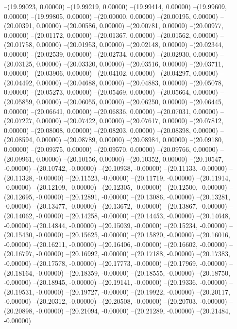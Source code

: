 --(19.99023, 0.00000)
--(19.99219, 0.00000)
--(19.99414, 0.00000)
--(19.99609, 0.00000)
--(19.99805, 0.00000)
--(20.00000, 0.00000)
--(20.00195, 0.00000)
--(20.00391, 0.00000)
--(20.00586, 0.00000)
--(20.00781, 0.00000)
--(20.00977, 0.00000)
--(20.01172, 0.00000)
--(20.01367, 0.00000)
--(20.01562, 0.00000)
--(20.01758, 0.00000)
--(20.01953, 0.00000)
--(20.02148, 0.00000)
--(20.02344, 0.00000)
--(20.02539, 0.00000)
--(20.02734, 0.00000)
--(20.02930, 0.00000)
--(20.03125, 0.00000)
--(20.03320, 0.00000)
--(20.03516, 0.00000)
--(20.03711, 0.00000)
--(20.03906, 0.00000)
--(20.04102, 0.00000)
--(20.04297, 0.00000)
--(20.04492, 0.00000)
--(20.04688, 0.00000)
--(20.04883, 0.00000)
--(20.05078, 0.00000)
--(20.05273, 0.00000)
--(20.05469, 0.00000)
--(20.05664, 0.00000)
--(20.05859, 0.00000)
--(20.06055, 0.00000)
--(20.06250, 0.00000)
--(20.06445, 0.00000)
--(20.06641, 0.00000)
--(20.06836, 0.00000)
--(20.07031, 0.00000)
--(20.07227, 0.00000)
--(20.07422, 0.00000)
--(20.07617, 0.00000)
--(20.07812, 0.00000)
--(20.08008, 0.00000)
--(20.08203, 0.00000)
--(20.08398, 0.00000)
--(20.08594, 0.00000)
--(20.08789, 0.00000)
--(20.08984, 0.00000)
--(20.09180, 0.00000)
--(20.09375, 0.00000)
--(20.09570, 0.00000)
--(20.09766, 0.00000)
--(20.09961, 0.00000)
--(20.10156, 0.00000)
--(20.10352, 0.00000)
--(20.10547, -0.00000)
--(20.10742, -0.00000)
--(20.10938, -0.00000)
--(20.11133, -0.00000)
--(20.11328, -0.00000)
--(20.11523, -0.00000)
--(20.11719, -0.00000)
--(20.11914, -0.00000)
--(20.12109, -0.00000)
--(20.12305, -0.00000)
--(20.12500, -0.00000)
--(20.12695, -0.00000)
--(20.12891, -0.00000)
--(20.13086, -0.00000)
--(20.13281, -0.00000)
--(20.13477, -0.00000)
--(20.13672, -0.00000)
--(20.13867, -0.00000)
--(20.14062, -0.00000)
--(20.14258, -0.00000)
--(20.14453, -0.00000)
--(20.14648, -0.00000)
--(20.14844, -0.00000)
--(20.15039, -0.00000)
--(20.15234, -0.00000)
--(20.15430, -0.00000)
--(20.15625, -0.00000)
--(20.15820, -0.00000)
--(20.16016, -0.00000)
--(20.16211, -0.00000)
--(20.16406, -0.00000)
--(20.16602, -0.00000)
--(20.16797, -0.00000)
--(20.16992, -0.00000)
--(20.17188, -0.00000)
--(20.17383, -0.00000)
--(20.17578, -0.00000)
--(20.17773, -0.00000)
--(20.17969, -0.00000)
--(20.18164, -0.00000)
--(20.18359, -0.00000)
--(20.18555, -0.00000)
--(20.18750, -0.00000)
--(20.18945, -0.00000)
--(20.19141, -0.00000)
--(20.19336, -0.00000)
--(20.19531, -0.00000)
--(20.19727, -0.00000)
--(20.19922, -0.00000)
--(20.20117, -0.00000)
--(20.20312, -0.00000)
--(20.20508, -0.00000)
--(20.20703, -0.00000)
--(20.20898, -0.00000)
--(20.21094, -0.00000)
--(20.21289, -0.00000)
--(20.21484, -0.00000)
